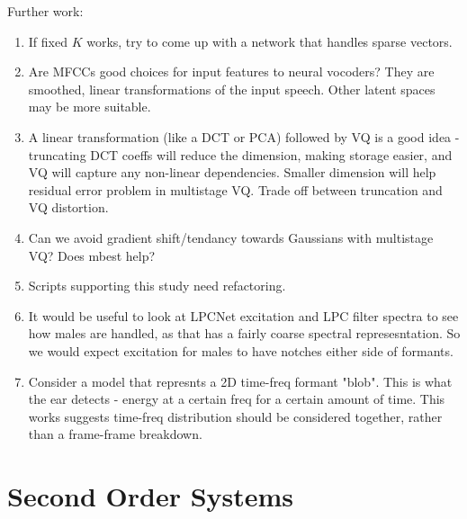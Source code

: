 \documentclass{article}
\begin{document}
Further work:
\begin{enumerate}
\item If fixed $K$ works, try to come up with a network that handles sparse vectors.
\item Are MFCCs good choices for input features to neural vocoders? They are smoothed, linear transformations of the input speech.  Other latent spaces may be more suitable.
\item A linear transformation (like a DCT or PCA) followed by VQ is a good idea - truncating DCT coeffs will reduce the dimension, making storage easier, and VQ will capture any non-linear dependencies.  Smaller dimension will help residual error problem in multistage VQ. Trade off between truncation and VQ distortion.
\item Can we avoid gradient shift/tendancy towards Gaussians with multistage VQ?  Does mbest help?
\item Scripts supporting this study need refactoring.
\item It would be useful to look at LPCNet excitation and LPC filter spectra to see how males are handled, as that has a fairly coarse spectral represesntation.  So we would expect excitation for males to have notches either side of formants.
\item Consider a model that represnts a 2D time-freq formant "blob".  This is what the ear detects - energy at a certain freq for a certain amount of time.  This works suggests time-freq distribution should be considered together, rather than a frame-frame breakdown.
\end{enumerate}

\appendix

\section{Second Order Systems}
\label{sec:second_order}
\end{document}

